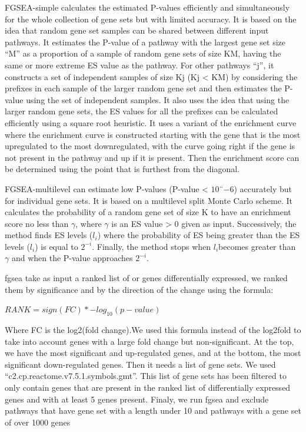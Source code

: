 \documentclass[a4paper, 11pt]{article}
\begin{document}
\begin{multicols}{2}
FGSEA-simple calculates the estimated P-values efficiently and simultaneously for the whole collection of gene sets but with limited accuracy. It is based on the idea that random gene set samples can be shared between different input pathways. It estimates the P-value of a pathway with the largest gene set size “M” as a proportion of a sample of random gene sets of size KM, having the same or more extreme ES value as the pathway. For other pathways “j”, it constructs a set of independent samples of size Kj (Kj < KM) by considering the prefixes in each sample of the larger random gene set and then estimates the P-value using the set of independent samples. It also uses the idea that using the larger random gene sets, the ES values for all the prefixes can be calculated efficiently using a square root heuristic. It uses a variant of the enrichment curve where the enrichment curve is constructed starting with the gene that is the most upregulated to the most downregulated, with the curve going right if the gene is not present in the pathway and up if it is present. Then the enrichment score can be determined using the point that is furthest from the diagonal.

FGSEA-multilevel can estimate low P-values (P-value < $10¨{-6}$) accurately but for individual gene sets. It is based on a multilevel split Monte Carlo scheme. It calculates the probability of a random gene set of size K to have an enrichment score no less than $\gamma$, where $\gamma$ is an ES value > 0 given as input. Successively, the method finds ES levels ($l_i$) where the probability of ES being greater than the ES levels ($l_i$) is equal to $2^{-i}$. Finally, the method stops when $ l_i $becomes greater than $\gamma$ and when the P-value approaches $2^{-i}$.

fgsea take as input a ranked list of or genes differentially expressed, we ranked them by significance and by the direction of the change using the formula:

 $ RANK =sign(FC)* -log_{10}(p-value)  $
 
 Where FC is the log2(fold change).We used this formula instead of the log2fold to take into account genes with a large fold change but non-significant. At the top, we have the most significant and up-regulated genes, and at the bottom, the most significant down-regulated genes. Then it needs a list of gene sets. We used “c2.cp.reactome.v7.5.1.symbols.gmt”. This list of gene sets has been filtered to only contain genes  that are present in the ranked list of differentially expressed genes and with at least 5 genes present. Finaly, we run fgsea and exclude pathways that have gene set with a length under 10 and pathways with a gene set of over 1000 genes 








\end{multicols}
\end{document}
